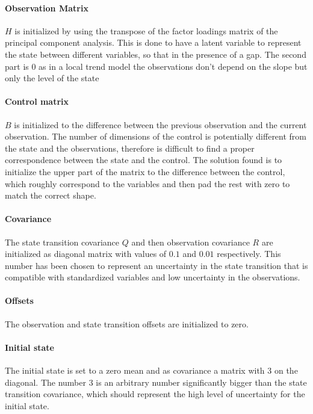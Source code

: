\documentclass{article}
\begin{document}
\paragraph{Observation Matrix} $H$ is initialized by using the transpose of the factor loadings matrix of the principal component analysis. This is done to have a latent variable to represent the state between different variables, so that in the presence of a gap. The second part is 0 as in a local trend model the observations don't depend on the slope but only the level of the state

\paragraph{Control matrix} $B$ is initialized to the difference between the previous observation and the current observation. The number of dimensions of the control is potentially different from the state and the observations, therefore is difficult to find a proper correspondence between the state and the control. The solution found is to initialize the upper part of the matrix to the difference between the control, which roughly correspond to the variables and then pad the rest with zero to match the correct shape.

\paragraph{Covariance} The state transition covariance $Q$ and then observation covariance $R$ are initialized as diagonal matrix with values of $0.1$ and $0.01$ respectively. This number has been chosen to represent an uncertainty in the state transition that is compatible with standardized variables  and low uncertainty in the observations. 

\paragraph{Offsets} The observation and state transition offsets are initialized to zero.

\paragraph{Initial state} The initial state is set to a zero mean and as covariance a matrix with 3 on the diagonal. The number 3 is an arbitrary number significantly bigger than the state transition covariance, which should represent the high level of uncertainty for the initial state.  
\end{document}
